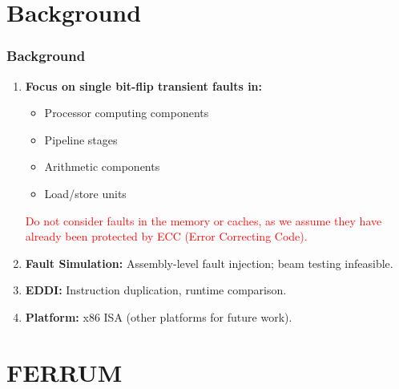 \documentclass[
	12pt, %
]{beamer}
\begin{document}

\section{Background}
\begin{frame}
	\frametitle{Background}
	\begin{enumerate}
		\item \textbf{Focus on single bit-ﬂip transient faults in:}
		\begin{itemize}
			\item Processor computing components
			\item Pipeline stages
			\item Arithmetic components
			\item Load/store units
		\end{itemize}
		\textcolor{red}{Do not consider faults in the memory or caches, as we assume they have already been protected by ECC (Error Correcting Code).}
		
		\item \textbf{Fault Simulation:}
		Assembly-level fault injection; beam testing infeasible.
		
		\item \textbf{EDDI:}
		Instruction duplication, runtime comparison.
		
		
		\item \textbf{Platform:} x86 ISA (other platforms for future work).
	\end{enumerate}
\end{frame}





\section{FERRUM}
\end{document}
